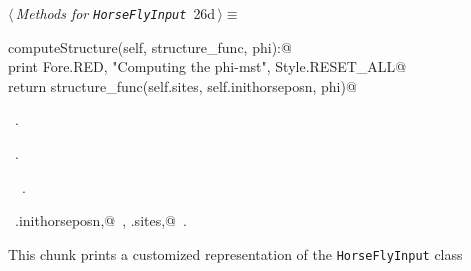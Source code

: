 \documentclass[11.5pt]{report}
\begin{document}
\vspace{-0.8cm}
\newchunk 
\begin{flushleft} \small\label{scrap33}\raggedright\small
{} $\langle\,${\itshape Methods for \verb|HorseFlyInput|}\nobreak\ {\footnotesize {26d}}$\,\rangle\equiv$
\vspace{-1ex}
\begin{list}{}{} \item
\mbox{}\verb@def  computeStructure(self, structure_func, phi):@\\
\mbox{}\verb@   print Fore.RED, "Computing the phi-mst", Style.RESET_ALL@\\
\mbox{}\verb@   return structure_func(self.sites, self.inithorseposn, phi)@\\
\mbox{}\verb@@{\NWsep}
\end{list}
\vspace{-1.5ex}
\footnotesize
\begin{list}{}{\setlength{\itemsep}{-\parsep}\setlength{\itemindent}{-\leftmargin}}
\item \NWtxtMacroDefBy\ .
\item \NWtxtMacroRefIn\ .
\item \NWtxtIdentsDefed\nobreak\  \verb@computeStructure@\nobreak\ .\item \NWtxtIdentsUsed\nobreak\  \verb@self.inithorseposn,@\nobreak\ , \verb@self.sites,@\nobreak\ .
\item{}
\end{list}
\vspace{4ex}
\end{flushleft}

\vspace{-0.8cm} \newchunk This chunk prints a customized representation of the \verb|HorseFlyInput| class
\end{document}

